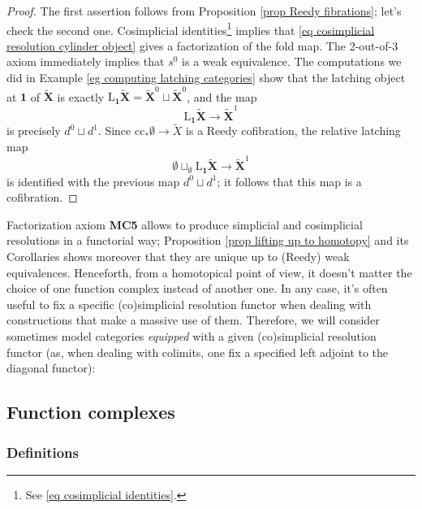 \begin{refsection}
\begin{proof}
The first assertion follows from Proposition \ref{prop Reedy fibrations}; let's check the second one. Cosimplicial identities\footnote{See \eqref{eq cosimplicial identities}.} implies that \eqref{eq cosimplicial resolution cylinder object} gives a factorization of the fold map. The 2-out-of-3 axiom immediately implies that $s^0$ is a weak equivalence. The computations we did in Example \ref{eg computing latching categories} show that the latching object at $\mathbf 1$ of $\widetilde{\mathbf X}$ is exactly $\mathrm L_{\mathbf 1} \widetilde{\mathbf X} = \widetilde{\mathbf X}^0 \sqcup \widetilde{\mathbf X}^0$, and the map
\[
\mathrm L_{\mathbf 1} \widetilde{\mathbf X} \to \widetilde{\mathbf X}^1
\]
is precisely $d^0 \sqcup d^1$. Since $\mathrm{cc}_* \emptyset \to \widetilde{X}$ is a Reedy cofibration, the relative latching map
\[
\emptyset \sqcup_{\emptyset} \mathrm L_{\mathbf 1} \widetilde{\mathbf X} \to \widetilde{\mathbf X}^1
\]
is identified with the previous map $d^0 \sqcup d^1$; it follows that this map is a cofibration.
\end{proof}

Factorization axiom {\bfseries MC5} allows to produce simplicial and cosimplicial resolutions in a functorial way; Proposition \ref{prop lifting up to homotopy} and its Corollaries shows moreover that they are unique up to (Reedy) weak equivalences. Henceforth, from a homotopical point of view, it doesn't matter the choice of one function complex instead of another one. In any case, it's often useful to fix a specific (co)simplicial resolution functor when dealing with constructions that make a massive use of them. Therefore, we will consider sometimes model categories \emph{equipped} with a given (co)simplicial resolution functor (as, when dealing with colimits, one fix a specified left adjoint to the diagonal functor): %

\subsection{Function complexes}

\subsubsection*{Definitions}


\end{refsection}
